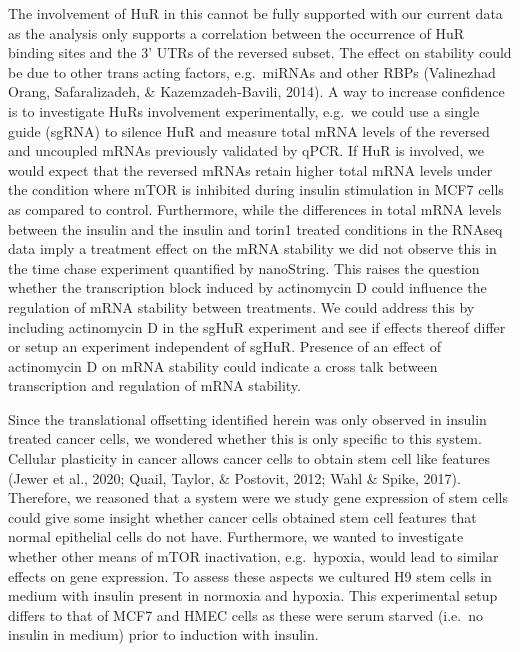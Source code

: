\documentclass[12pt,openany]{book}
\begin{document}
The involvement of HuR in this cannot be fully supported with our
current data as the analysis only supports a correlation between the
occurrence of HuR binding sites and the 3' UTRs of the reversed subset.
The effect on stability could be due to other trans acting factors,
e.g.~miRNAs and other RBPs (Valinezhad Orang, Safaralizadeh, \&
Kazemzadeh-Bavili, 2014). A way to increase confidence is to investigate
HuRs involvement experimentally, e.g.~we could use a single guide
(sgRNA) to silence HuR and measure total mRNA levels of the reversed and
uncoupled mRNAs previously validated by qPCR. If HuR is involved, we
would expect that the reversed mRNAs retain higher total mRNA levels
under the condition where mTOR is inhibited during insulin stimulation
in MCF7 cells as compared to control. Furthermore, while the differences
in total mRNA levels between the insulin and the insulin and torin1
treated conditions in the RNAseq data imply a treatment effect on the
mRNA stability we did not observe this in the time chase experiment
quantified by nanoString. This raises the question whether the
transcription block induced by actinomycin D could influence the
regulation of mRNA stability between treatments. We could address this
by including actinomycin D in the sgHuR experiment and see if effects
thereof differ or setup an experiment independent of sgHuR. Presence of
an effect of actinomycin D on mRNA stability could indicate a cross talk
between transcription and regulation of mRNA stability.

Since the translational offsetting identified herein was only observed
in insulin treated cancer cells, we wondered whether this is only
specific to this system. Cellular plasticity in cancer allows cancer
cells to obtain stem cell like features (Jewer et al., 2020; Quail,
Taylor, \& Postovit, 2012; Wahl \& Spike, 2017). Therefore, we reasoned
that a system were we study gene expression of stem cells could give
some insight whether cancer cells obtained stem cell features that
normal epithelial cells do not have. Furthermore, we wanted to
investigate whether other means of mTOR inactivation, e.g.~hypoxia,
would lead to similar effects on gene expression. To assess these
aspects we cultured H9 stem cells in medium with insulin present in
normoxia and hypoxia. This experimental setup differs to that of MCF7
and HMEC cells as these were serum starved (i.e.~no insulin in medium)
prior to induction with insulin.
\end{document}
